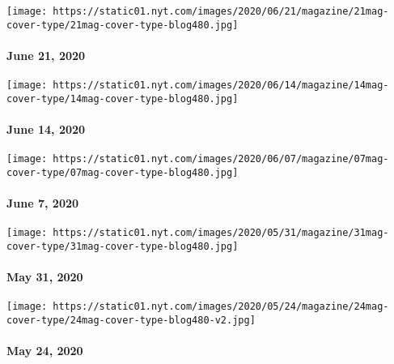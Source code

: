 \href{https://www.nytimes.com/issue/magazine/2020/06/19/the-62120-issue}{}

\texttt{[image: https://static01.nyt.com/images/2020/06/21/magazine/21mag-cover-type/21mag-cover-type-blog480.jpg]}

\hypertarget{june-21-2020}{%
\paragraph{June 21, 2020}\label{june-21-2020}}

\href{https://www.nytimes.com/issue/magazine/2020/06/12/the-61420-issue}{}

\texttt{[image: https://static01.nyt.com/images/2020/06/14/magazine/14mag-cover-type/14mag-cover-type-blog480.jpg]}

\hypertarget{june-14-2020}{%
\paragraph{June 14, 2020}\label{june-14-2020}}

\href{https://www.nytimes.com/issue/magazine/2020/06/05/the-6720-issue}{}

\texttt{[image: https://static01.nyt.com/images/2020/06/07/magazine/07mag-cover-type/07mag-cover-type-blog480.jpg]}

\hypertarget{june-7-2020}{%
\paragraph{June 7, 2020}\label{june-7-2020}}

\href{https://www.nytimes.com/issue/magazine/2020/05/29/the-53120-issue}{}

\texttt{[image: https://static01.nyt.com/images/2020/05/31/magazine/31mag-cover-type/31mag-cover-type-blog480.jpg]}

\hypertarget{may-31-2020}{%
\paragraph{May 31, 2020}\label{may-31-2020}}

\href{https://www.nytimes.com/issue/magazine/2020/05/22/the-52420-issue}{}

\texttt{[image: https://static01.nyt.com/images/2020/05/24/magazine/24mag-cover-type/24mag-cover-type-blog480-v2.jpg]}

\hypertarget{may-24-2020}{%
\paragraph{May 24, 2020}\label{may-24-2020}}


